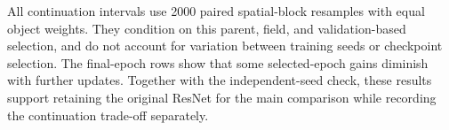 All continuation intervals use 2000 paired spatial-block resamples with equal object weights.
They condition on this parent, field, and validation-based selection, and do not account for variation between training seeds or checkpoint selection.
The final-epoch rows show that some selected-epoch gains diminish with further updates.
Together with the independent-seed check, these results support retaining the original ResNet for the main comparison while recording the continuation trade-off separately.
